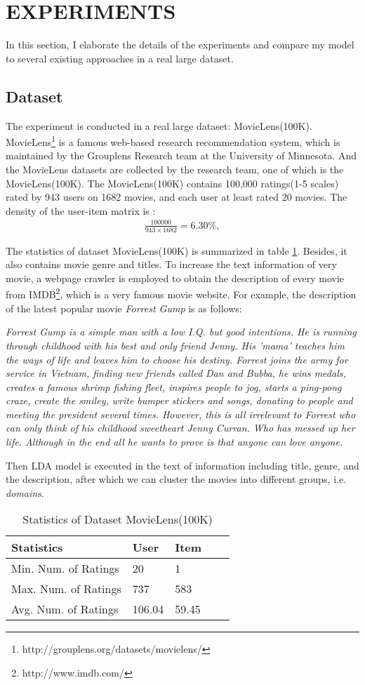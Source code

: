 \section{EXPERIMENTS}
In this section, I elaborate the details of the experiments and compare my model to several existing approaches in a real large dataset.
\subsection{Dataset}
The experiment is conducted in a real large dataset: MovieLens(100K). MovieLens\footnote{http://grouplens.org/datasets/movielens/} is a famous web-based research recommendation system, which is maintained by the Grouplens Research team at the University of Minnesota. And the MovieLens datasets are collected by the research team, one of which is the MovieLens(100K). The MovieLens(100K) contains 100,000 ratings(1-5 scales) rated by 943 users on 1682 movies, and each user at least rated 20 movies. The density of the user-item matrix is :
\begin{align*}
	\frac{100000}{943 \times 1682} = 6.30\%,
\end{align*}

The statistics of dataset MovieLens(100K) is summarized in table \ref{stats}. Besides, it also contains movie genre and titles. To increase the text information of very movie, a webpage crawler is employed to obtain the description of every movie from IMDB\footnote{http://www.imdb.com/}, which is a very famous movie website. For example, the description of the latest popular movie \textit{Forrest Gump}
is as follows:

\textit{Forrest Gump is a simple man with a low I.Q. but good intentions. He is running through childhood with his best and only friend Jenny. His 'mama' teaches him the ways of life and leaves him to choose his destiny. Forrest joins the army for service in Vietnam, finding new friends called Dan and Bubba, he wins medals, creates a famous shrimp fishing fleet, inspires people to jog, starts a ping-pong craze, create the smiley, write bumper stickers and songs, donating to people and meeting the president several times. However, this is all irrelevant to Forrest who can only think of his childhood sweetheart Jenny Curran. Who has messed up her life. Although in the end all he wants to prove is that anyone can love anyone.}

Then LDA model is executed in the text of information including title, genre, and the description, after which we can cluster the movies into different groups, i.e. \textit{domains}.
\begin{table}[]
	\centering
	\caption{Statistics of Dataset MovieLens(100K)}
	\label{stats}
	\begin{tabular}{|l|l|l|l|l|}
		\hline
		Statistics  & User  & Item   \\ \hline
		Min. Num. of Ratings  &20  &1   \\ \hline
		Max. Num. of Ratings  &737  &583  \\ \hline
		Avg. Num. of Ratings  &106.04  &59.45  \\ \hline
	\end{tabular}
\end{table}


